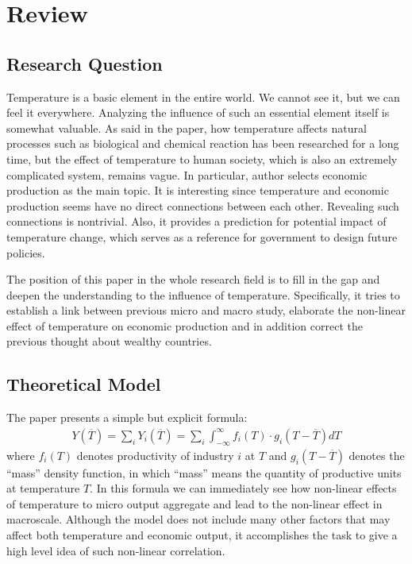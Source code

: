 \documentclass[letterpaper]{article}
\begin{document}
\section{Review}

\subsection{Research Question}

Temperature is a basic element in the entire world. We cannot see it, but we can feel it everywhere. Analyzing the influence of such an essential element itself is somewhat valuable. As said in the paper, how temperature affects natural processes such as biological and chemical reaction has been researched for a long time, but the effect of temperature to human society, which is also an extremely complicated system, remains vague. In particular, author selects economic production as the main topic. It is interesting since temperature and economic production seems have no direct connections between each other. Revealing such connections is nontrivial. Also, it provides a prediction for potential impact of temperature change, which serves as a reference for government to design future policies. 

The position of this paper in the whole research field is to fill in the gap and deepen the understanding to the influence of temperature. Specifically, it tries to establish a link between previous micro and macro study, elaborate the non-linear effect of temperature on economic production and in addition correct the previous thought about wealthy countries. 

\subsection{Theoretical Model}

The paper presents a simple but explicit formula:
\begin{eqnarray}
  Y(\overline{T}) = \sum_{i}Y_i(\overline{T}) = \sum_{i}\int_{-\infty}^{\infty}f_i(T)\cdot g_i(T-\overline{T})dT
\end{eqnarray}
where $f_i(T)$ denotes productivity of industry $i$ at $T$ and $g_i(T-\overline{T})$ denotes the ``mass'' density function, in which ``mass'' means the quantity of productive units at temperature $T$. In this formula we can immediately see how non-linear effects of temperature to micro output aggregate and lead to the non-linear effect in macroscale. Although the model does not include many other factors that may affect both temperature and economic output, it accomplishes the task to give a high level idea of such non-linear correlation.
\end{document}
